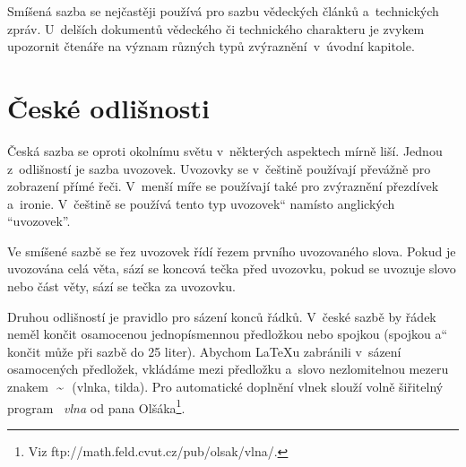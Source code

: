 \documentclass[a4paper,11pt,twocolumn]{article}
\newcommand{\myuv}[1]{\quotedblbase #1\textquotedblleft}
\begin{document}
Smíšená sazba se nejčastěji používá pro sazbu vě\-dec\-kých článků a~technických zpráv. U~delších do\-ku\-men\-tů vědeckého či technického charakteru je zvykem upozornit čtenáře na význam různých typů zvý\-raz\-ně\-ní~v~úvodní kapitole.
	
	\section{České odlišnosti}
Česká sazba se oproti okolnímu světu v~některých aspektech mírně liší. Jednou z~odlišností je sazba u\-vo\-zo\-vek. Uvozovky se v~češtině používají převážně pro zobrazení přímé řeči. V~menší míře se používají také pro zvýraznění přezdívek a~ironie. V~češtině se po\-u\-ží\-vá tento \myuv{typ uvozovek} namísto anglických ``u\-vo\-zo\-vek''.

Ve smíšené sazbě se řez uvozovek řídí řezem prv\-ní\-ho uvozovaného slova. Pokud je uvozována celá věta, sází se koncová tečka před uvozovku, pokud se uvozuje slovo nebo část věty, sází se tečka za uvozovku.

Druhou odlišností je pravidlo pro sázení konců řádků. V~české sazbě by řádek neměl končit o\-sa\-mo\-ce\-nou jednopísmennou předložkou nebo spojkou (spoj\-kou \myuv{a} končit může při sazbě do 25 liter). Abychom \LaTeX u zabránili v~sázení osamocených předložek, vkládáme mezi předložku a~slovo nezlomitelnou me\-ze\-ru znakem\ \,\~{}\ \,(vlnka, tilda). Pro automatické do\-plnění vlnek slouží volně šiřitelný program ~\emph{vlna} od pana Olšáka\footnote{Viz ftp://math.feld.cvut.cz/pub/olsak/vlna/.}.
\end{document}
